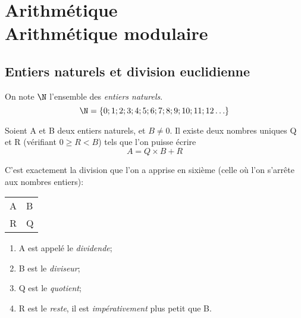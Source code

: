 \documentclass[a4paper,12pt,french]{book}
\begin{document}
\setcounter{chapter}{3}
\chapter{\large Arithmétique\\[-1em]\fontsize{35pt}{42pt}\selectfont\titlefont Arithmétique modulaire}

\section{Entiers naturels et division euclidienne}

\begin{definition}
	On note $\N$ l'ensemble des \textit{entiers naturels}. $$\N=\lbrace 0;1;2;3;4;5;6;7;8;9;10;11;12\ldots\}$$
\end{definition}

\begin{definition}
	
	Soient A et B deux entiers naturels, et $B\neq 0$. Il existe deux nombres uniques Q et R (vérifiant $0\geqslant R<B$) tels que l'on puisse écrire
	$$A = Q\times B + R$$
	
	C'est exactement la division que l'on a apprise en sixième (celle où l'on s'arrête aux nombres entiers):
	\begin{center}
		\begin{tabular}{r|l}
			A & B\\
			\cline{2-2}
			R & Q
		\end{tabular}
		
		\begin{enumerate}[\textbullet]
			\item 	A est appelé le \textit{dividende};
			\item 	B est le \textit{diviseur};
			\item	Q est le \textit{quotient};
			\item 	R est le \textit{reste}, il est \textit{impérativement} plus petit que B.
		\end{enumerate}
	\end{center}
\end{definition}
\end{document}
